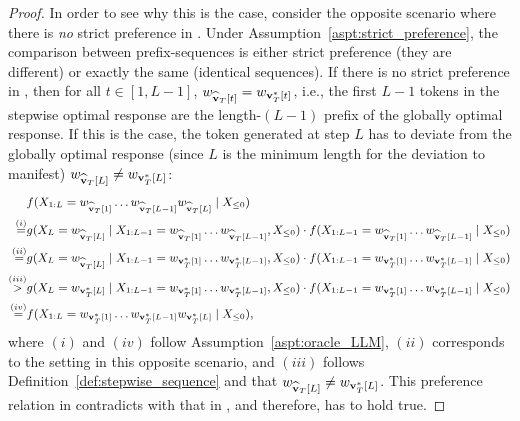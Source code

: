 \begin{proof}
    In order to see why this is the case, consider the opposite scenario where there is \emph{no} strict preference in .
    Under Assumption~\ref{aspt:strict_preference}, the comparison between prefix-sequences is either strict preference (they are different) or exactly the same (identical sequences).
    If there is no strict preference in , then for all $t \in [1, L-1]$, $w_{\widehat{\mathbf{v}}_T[t]} = w_{\mathbf{v}_T^*[t]}$, i.e., the first $L-1$ tokens in the stepwise optimal response are the length-$(L - 1)$ prefix of the globally optimal response.
    If this is the case, the token generated at step $L$ has to deviate from the globally optimal response (since $L$ is the minimum length for the deviation to manifest) $w_{\widehat{\mathbf{v}}_T[L]} \neq w_{\mathbf{v}_T^*[L]}$:
    \begin{equation}\label{equ:opposite_preference}
        \small
        \begin{split}
                               & f(X_{1:L} = w_{\widehat{\mathbf{v}}_T[1]} \ldots w_{\widehat{\mathbf{v}}_T[L - 1]} w_{\widehat{\mathbf{v}}_T[L]} \mid X_{\leq 0})          \\
            \overset{(i)}{=}   & g(X_L = w_{\widehat{\mathbf{v}}_T[L]} \mid X_{1:L-1} = w_{\widehat{\mathbf{v}}_T[1]} \ldots w_{\widehat{\mathbf{v}}_T[L - 1]}, X_{\leq 0})
            \cdot f(X_{1:L - 1} = w_{\widehat{\mathbf{v}}_T[1]} \ldots w_{\widehat{\mathbf{v}}_T[L - 1]} \mid X_{\leq 0})                                             \\
            \overset{(ii)}{=}  & g(X_L = w_{\widehat{\mathbf{v}}_T[L]} \mid X_{1:L-1} = w_{\mathbf{v}_T^*[1]} \ldots w_{\mathbf{v}_T^*[L - 1]}, X_{\leq 0})
            \cdot f(X_{1:L - 1} = w_{\mathbf{v}_T^*[1]} \ldots w_{\mathbf{v}_T^*[L - 1]} \mid X_{\leq 0})                                                             \\
            \overset{(iii)}{>} & g(X_L = w_{\mathbf{v}_T^*[L]} \mid X_{1:L-1} = w_{\mathbf{v}_T^*[1]} \ldots w_{\mathbf{v}_T^*[L - 1]}, X_{\leq 0})
            \cdot f(X_{1:L - 1} = w_{\mathbf{v}_T^*[1]} \ldots w_{\mathbf{v}_T^*[L - 1]} \mid X_{\leq 0})                                                             \\
            \overset{(iv)}{=}  & f(X_{1:L} = w_{\mathbf{v}_T^*[1]} \ldots w_{\mathbf{v}_T^*[L - 1]} w_{\mathbf{v}_T^*[L]} \mid X_{\leq 0}),
        \end{split}
    \end{equation}
    where $(i)$ and $(iv)$ follow Assumption~\ref{aspt:oracle_LLM}, $(ii)$ corresponds to the setting in this opposite scenario, and $(iii)$ follows Definition~\ref{def:stepwise_sequence} and that $w_{\widehat{\mathbf{v}}_T[L]} \neq w_{\mathbf{v}_T^*[L]}$.
    This preference relation in  contradicts with that in , and therefore,  has to hold true.


\end{proof}
